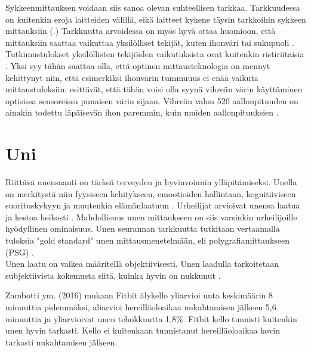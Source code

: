\documentclass[utf8,bachelor,finnish]{bachelor}
\begin{document}
  
   Sykkeenmittauksen voidaan siis sanoa olevan suhteellisen tarkkaa.
    Tarkkuudessa on kuitenkin eroja laitteiden välillä, eikä laitteet kykene täysin tarkkoihin sykkeen mittauksiin
     (\cite{pasadyn_accuracy_2019,wang_accuracy_2017,nelson_accuracy_2019}.) Tarkkuutta arvoidessa on myös hyvä ottaa huomioon, että mittauksiin saattaa vaikuttaa
      yksilölliset tekijät, kuten ihonväri tai sukupuoli \cite{shcherbina_accuracy_2017,hochstadt_continuous_2020}.
       Tutkimustulokset yksilöllisten tekijöiden vaikutuksista ovat kuitenkin ristiriitaisia \parencite{koerber_accuracy_2022, pasadyn_accuracy_2019}.
        Yksi syy tähän saattaa olla, että optinen mittausteknologia on mennyt kehittynyt niin, että esimerkiksi ihonvärin tummuuus ei enää vaikuta mittaustuloksiin.
         \textcite{koerber_accuracy_2022} esittävät, että tähän voisi olla syynä vihreän värin käyttäminen optisissa sensoreissa punaisen värin sijaan.
          Vihreän valon 520 aallonpituuden on ainakin todettu läpäisevän ihon paremmin, kuin muiden aallonpituuksien \parencite{fallow_influence_2013}.
        
       

  \section{Uni}
  Riittävä unensaanti on tärkeä terveyden ja hyvinvoinnin ylläpitämiseksi. Unella on merkitystä niin fyysiseen kehitykseen,
   emootioiden hallintaan, kognitiiviseen suorituskykyyn ja muutenkin elämänlaatuun \parencite{watson_sleep_2017}. 
    Urheilijat arvioivat unensa laatua ja kestoa heikosti \parencite{watson_sleep_2017}. Mahdollisuus unen mittaukseen
     on siis varsinkin urheilijoille hyödyllinen ominaisuus. Unen seurannan tarkkuutta tutkitaan vertaamalla tuloksia "gold standard"
      unen mittausmenetelmään, eli polygrafiamittaukseen (PSG) \parencite{de_zambotti_measures_2016, rundo_chapter_2019, miller_validation_2022}.\\
  
  Unen laatu on vaikea määritellä objektiivisesti. Unen laadulla tarkoitetaan subjektiivista kokemusta siitä, kuinka hyvin on nukkunut \parencite{kohyama_which_2021}.
   

   Zambotti ym. (2016) mukaan Fitbit älykello yliarvioi unta keskimäärin
    8 minuuttia pidemmäksi, aliarvioi hereilläoloaikaa nukahtamisen jälkeen 5,6 minuuttia ja yliarvioivat unen tehokkuutta 1,8\%.
     Fitbit kello tunnisti kuitenkin unen hyvin tarkasti.
      Kello ei kuitenkaan tunnistanut hereilläoloaikaa kovin tarkasti nukahtamisen jälkeen.\\
  
\end{document}
